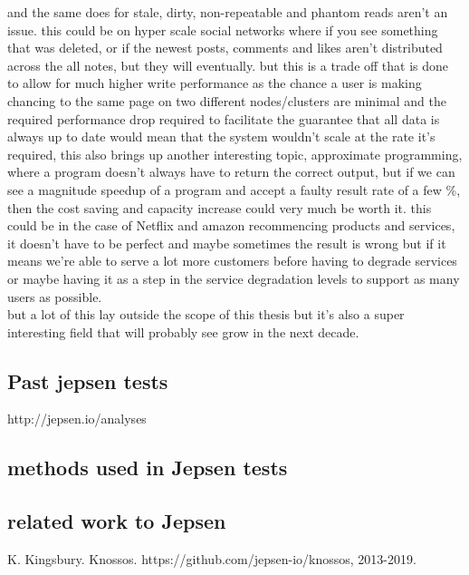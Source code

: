 \documentclass[
  a4paper,  %
  twoside,  %
  bibliography=totoc,
  headsepline,
  cleardoublepage=empty,
  parskip=half,
  draft=false
]{scrbook}
\begin{document}
and the same does for stale, dirty, non-repeatable and phantom reads aren't an issue. this could be on hyper scale social networks where if you see something that was deleted, or if the newest posts, comments and likes aren't distributed across the all notes, but they will eventually. but this is a trade off that is done to allow for much higher write performance as the chance a user is making chancing to the same page on two different nodes/clusters are minimal and the required performance drop required to facilitate the guarantee that all data is always up to date would mean that the system wouldn't scale at the rate it's required, this also brings up another interesting topic, approximate programming, where a program doesn't always have to return the correct output, but if we can see a magnitude speedup of a program and accept a faulty result rate of a few \%, then the cost saving and capacity increase could very much be worth it. this could be in the case of Netflix and amazon recommencing products and services, it doesn't have to be perfect and maybe sometimes the result is wrong but if it means we're able to serve a lot more customers before having to degrade services or maybe having it as a step in the service degradation levels to support as many users as possible. \\

but a lot of this lay outside the scope of this thesis but it's also a super interesting field that will probably see grow in the next decade.





\subsection{Past jepsen tests}

http://jepsen.io/analyses





\subsection{methods used in Jepsen tests}

\subsection{related work to Jepsen}


K. Kingsbury. Knossos.
https://github.com/jepsen-io/knossos, 2013-2019.
\end{document}
